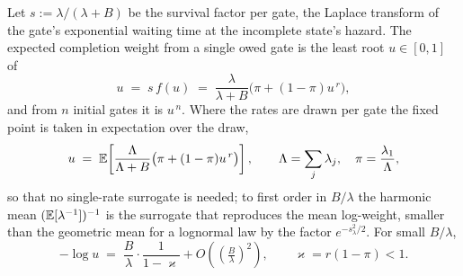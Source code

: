 \begin{proposition}\label{sch:prop:fixedpoint}
Let $s:=\lambda/(\lambda+B)$ be the survival factor per gate, the
Laplace transform of the gate's exponential waiting time at the
incomplete state's hazard. The expected completion weight from a single
owed gate is the least root $u\in[0,1]$ of
\begin{equation}\label{sch:eq:fixedpoint}
u\;=\;s\,f(u)\;=\;\frac{\lambda}{\lambda+B}\bigl(\pi+(1-\pi)u^{\,r}\bigr),
\end{equation}
and from $n$ initial gates it is $u^{\,n}$. Where the rates are drawn
per gate the fixed point is taken in expectation over the draw,
\begin{equation}\label{sch:eq:fixedpointrandom}
u\;=\;\mathbb{E}\!\left[\frac{\Lambda}{\Lambda+B}\bigl(\pi+(1-\pi)u^{\,r}\bigr)\right],
\qquad\Lambda=\sum_j\lambda_j,\quad\pi=\frac{\lambda_1}{\Lambda},
\end{equation}
so that no single-rate surrogate is needed; to first order in
$B/\lambda$ the harmonic mean $(\mathbb{E}[\lambda^{-1}])^{-1}$ is the
surrogate that reproduces the mean log-weight, smaller than the
geometric mean for a lognormal law by the factor $e^{-s_\lambda^2/2}$. For small $B/\lambda$,
\begin{equation}\label{sch:eq:expansion}
-\log u\;=\;\frac{B}{\lambda}\cdot\frac{1}{1-\varkappa}
+O\!\left(\left(\tfrac{B}{\lambda}\right)^{2}\right),
\qquad \varkappa=r(1-\pi)<1 .
\end{equation}
\end{proposition}


